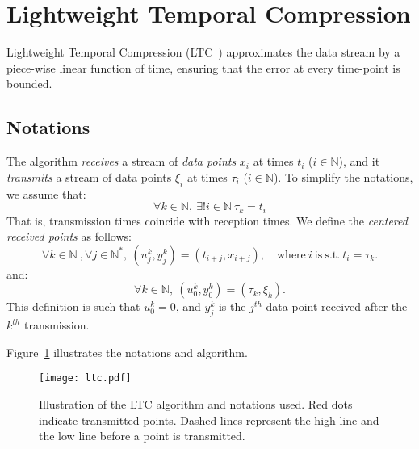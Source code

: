 \documentclass[10pt, conference, compsocconf]{IEEEtran}
\begin{document}




\section{Lightweight Temporal Compression}

Lightweight Temporal Compression 
(LTC~\cite{schoellhammer2004lightweight}) approximates the data stream 
by a piece-wise linear function of time, ensuring that the error at 
every time-point is bounded.

\subsection{Notations}

The algorithm \emph{receives} a stream of \emph{data points} $x_i$
at times $t_i$ ($i \in \mathbb{N}$), and it \emph{transmits} a stream of data points $\xi_i$ 
at times $\tau_i$ ($i \in \mathbb{N}$). To simplify the notations, we assume that:
\begin{equation*}
\forall k \in \mathbb{N}, \  \exists ! i \in \mathbb{N} \  \tau_k = t_i
\end{equation*}
That is, transmission times coincide with reception times. 
We define the \emph{centered received points} as follows:
\begin{equation*}
\forall k \in \mathbb{N}\ , \forall j \in \mathbb{N^*},\ (u^k_j, y^k_j) = (t_{i+j}, x_{i+j}), \quad \mathrm{where\ }i\mathrm{\ is\ s.t.}\ t_i = \tau_k.
\end{equation*}
and:
\begin{equation*}
\forall k \in \mathbb{N},\  (u^k_0, y^k_0) = (\tau_k, \xi_k).
\end{equation*}
This definition is such that $u^k_0=0$, and $y^k_j$ is the $j^{th}$ data point received
after the $k^{th}$ transmission.

Figure~\ref{fig:ltc} illustrates the notations and algorithm.  
\begin{figure}
\texttt{[image: ltc.pdf]}
\caption{Illustration of the LTC algorithm and notations used. Red dots indicate transmitted points. Dashed lines
represent the high line and the low line before a point is transmitted.}
\label{fig:ltc}
\end{figure}
\end{document}

